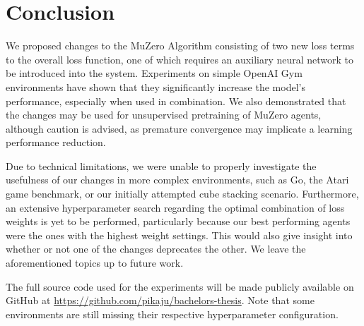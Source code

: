 \section{Conclusion}
We proposed changes to the MuZero Algorithm consisting of two new loss terms to the overall loss function, one of which requires an auxiliary neural network to be introduced into the system. Experiments on simple OpenAI Gym environments have shown that they significantly increase the model's performance, especially when used in combination. We also demonstrated that the changes may be used for unsupervised pretraining of MuZero agents, although caution is advised, as premature convergence may implicate a learning performance reduction.

Due to technical limitations, we were unable to properly investigate the usefulness of our changes in more complex environments, such as Go, the Atari game benchmark, or our initially attempted cube stacking scenario. Furthermore, an extensive hyperparameter search regarding the optimal combination of loss weights is yet to be performed, particularly because our best performing agents were the ones with the highest weight settings. This would also give insight into whether or not one of the changes deprecates the other. We leave the aforementioned topics up to future work.

The full source code used for the experiments will be made publicly available on GitHub at \url{https://github.com/pikaju/bachelors-thesis}. Note that some environments are still missing their respective hyperparameter configuration.